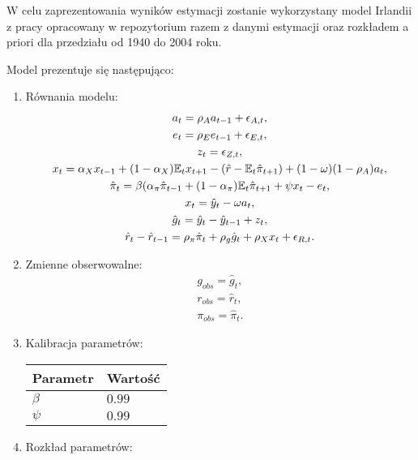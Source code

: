 W celu zaprezentowania wyników estymacji zostanie wykorzystany model Irlandii z pracy \cite{NBERw10309} opracowany w repozytorium \cite{Pfeifer_DSGE_mod_A_collection} razem z danymi estymacji oraz rozkładem a priori dla przedziału od 1940 do 2004 roku.

Model prezentuje się następująco:
\begin{enumerate}
    \item Równania modelu:
    \begin{gather}
        a_{t} = \rho_A a_{t-1} + \epsilon_{A,t},\\
        e_{t} = \rho_E e_{t-1} + \epsilon_{E,t},\\
        z_{t} = \epsilon_{Z,t},\\
        x_{t} = \alpha_X x_{t-1} + (1 - \alpha_X)\mathbb{E}_t x_{t+1} - (\hat{r} - \mathbb{E}_t \hat{\pi}_{t+1}) + (1-\omega) (1-\rho_A)a_{t},\\
        \hat{\pi}_{t} = \beta(\alpha_\pi \hat{\pi}_{t-1} + (1-\alpha_\pi)\mathbb{E}_t \hat{\pi}_{t+1} + \psi x_{t} - e_{t},\\
        x_{t} = \hat{y}_t - \omega a_{t},\\
        \hat{g}_{t} = \hat{y}_{t} - \hat{y}_{t-1} + z_t,\\
        \hat{r}_t - \hat{r}_{t-1} = \rho_\pi \hat{\pi}_t + \rho_g \hat{g}_t + \rho_X x_t + \epsilon_{R,t}.
    \end{gather}
    \item Zmienne obserwowalne:
    \begin{gather}
        g_{obs} = \hat{g}_t,\\
        r_{obs} = \hat{r}_t,\\
        \pi_{obs} = \hat{\pi}_t.
    \end{gather}
    \item Kalibracja parametrów:
        \begin{center}
            \begin{tabular}{|p{}|p{}|}
                \hline
                Parametr & Wartość \\
                \hline 
                $\beta$ & $0.99$\\
                $\psi$ & $0.99$ \\
                \hline 
            \end{tabular} 
         \end{center}
    \item Rozkład parametrów:
        \begin{center}

\end{center}
\end{enumerate}
